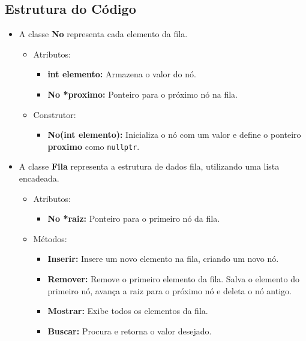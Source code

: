 \documentclass{article}
\begin{document}
\subsection*{Estrutura do Código}
\begin{itemize}
    \item A classe \textbf{No} representa cada elemento da fila.
    \begin{itemize}
        \item Atributos:
        \begin{itemize}
            \item \textbf{int elemento:} Armazena o valor do nó.
            \item \textbf{No *proximo:} Ponteiro para o próximo nó na fila.
        \end{itemize}
        \item Construtor:
        \begin{itemize}
            \item \textbf{No(int elemento):} Inicializa o nó com um valor e define o ponteiro \textbf{proximo} como \texttt{nullptr}.
        \end{itemize}
    \end{itemize}
    \item A classe \textbf{Fila} representa a estrutura de dados fila, utilizando uma lista encadeada.
    \begin{itemize}
        \item Atributos:
        \begin{itemize}
            \item \textbf{No *raiz:} Ponteiro para o primeiro nó da fila.
        \end{itemize}
        \item Métodos:
        \begin{itemize}
            \item \textbf{Inserir:} Insere um novo elemento na fila, criando um novo nó.
            \item \textbf{Remover:} Remove o primeiro elemento da fila. Salva o elemento do primeiro nó, avança a raiz para o próximo nó e deleta o nó antigo.
            \item \textbf{Mostrar:} Exibe todos os elementos da fila.
            \item \textbf{Buscar:} Procura e retorna o valor desejado.
        \end{itemize}
    \end{itemize}
\end{itemize}
\end{document}

